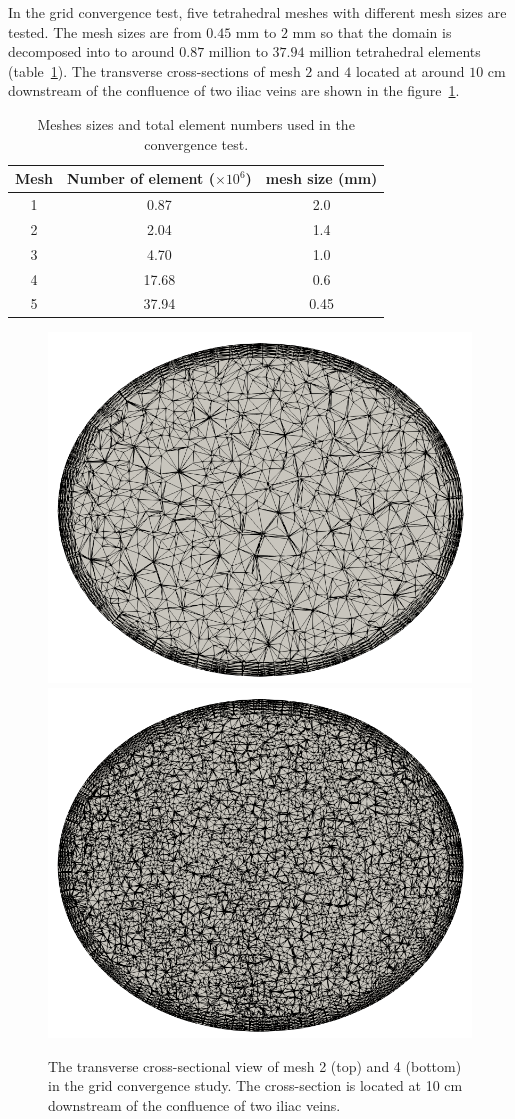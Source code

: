 In the grid convergence test, five tetrahedral meshes with different mesh sizes are tested. The mesh sizes are from $0.45$ mm to $2$ mm so that the domain is decomposed into to around $0.87$ million to $37.94$ million tetrahedral elements (table~\ref{tab:meshsize}). The transverse cross-sections of mesh $2$ and $4$ located at around $10$ cm downstream of the confluence of two iliac veins are shown in the figure~\ref{fig:IVCmesh}.

\begin{table}[h]
\caption {Meshes sizes and total element numbers used in the convergence test.} \label{tab:meshsize}
\centering
\begin{tabular}{|c|c|c|}
\hline
Mesh & Number of element ($\times10^6$)& mesh size (mm) \\ \hline
1    & 0.87              & 2.0              \\ \hline
2    & 2.04              & 1.4            \\ \hline
3    & 4.70              & 1.0               \\ \hline
4    & 17.68             & 0.6            \\ \hline
5    & 37.94             & 0.45            \\ \hline
\end{tabular}
\end{table}

\begin{figure}[h]\centering
    \includegraphics[width=0.5\linewidth]{imgs/vena_cava/mesh2_fixed.png}
    \includegraphics[width=0.5\linewidth]{imgs/vena_cava/mesh4.png}
    \caption{The transverse cross-sectional view of mesh 2 (top) and 4 (bottom) in the grid convergence study. The cross-section is located at 10 cm downstream of the confluence of two iliac veins.}
    \label{fig:IVCmesh}
\end{figure}

